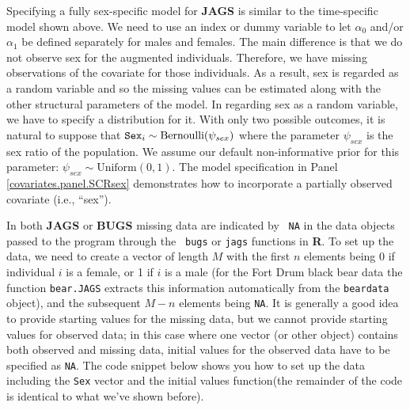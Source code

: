 Specifying a fully sex-specific model for {\bf JAGS} is similar to the
time-specific model shown above. We need to use an index or dummy
variable to let $\alpha_0$ and/or $\alpha_1$ be defined separately for
males and females. The main difference is that we do
not observe sex for the augmented individuals. Therefore, we have
missing observations of the covariate for those individuals. As a
result, sex is regarded as a random variable and so the missing values
can be estimated along with the other structural parameters of the
model. 
In regarding sex as a random variable, 
we have to specify a distribution for it.
With only two possible outcomes, it is natural to suppose that
$\mbox{\tt Sex}_{i} \sim
\mbox{Bernoulli}(\psi_{sex})$ where  the parameter $\psi_{sex}$ is the sex ratio of the
population.
We assume our default non-informative prior for this parameter:
$\psi_{sex} \sim \mbox{Uniform}(0,1)$.  The model
specification in Panel \ref{covariates.panel.SCRsex} demonstrates how
to incorporate a partially observed covariate (i.e., ``sex'').

In both {\bf JAGS} or {\bf BUGS} missing data are indicated by  {\tt
  NA} in the data objects passed to the program through the \mbox{\tt
  bugs} or \mbox{\tt jags} functions in {\bf R}. To set up the data,
we need to create a 
vector of length $M$ with the first $n$ elements being 0 if individual
$i$ is a female, or 1 if $i$ is a male (for the Fort Drum black bear
data the function {\tt bear.JAGS} extracts this information
automatically from the {\tt beardata} object), and the subsequent
$M-n$ elements being {\tt NA}.  It is generally a good idea to provide
starting values for the missing data, but we cannot provide starting
values for observed data; in this case where one vector (or other
object) contains both observed and missing data, initial values for
the observed data have to be specified as {\tt NA}.  The code snippet
below shows you how to set up the data including the {\tt Sex} vector
and the initial values function(the remainder of the code is identical to what we've
shown before).  

